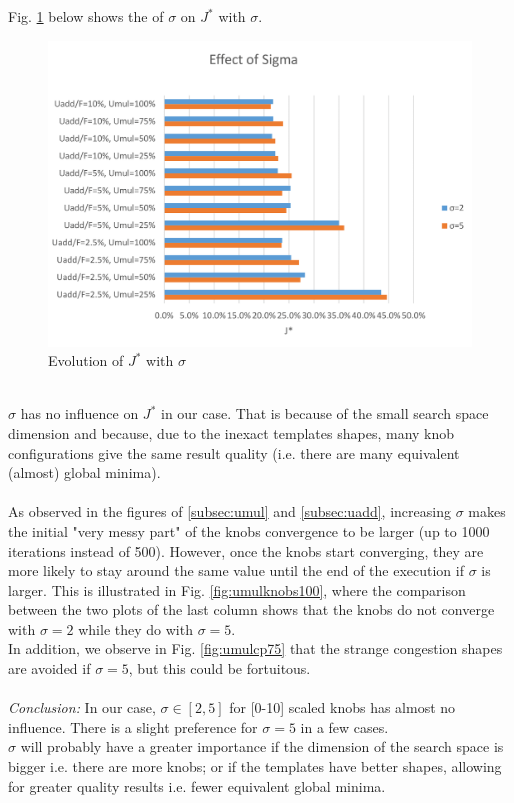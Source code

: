 Fig. \ref{fig:sigma} below shows the of $\sigma$ on $J^{*}$ with $\sigma$.\\
\begin{figure}[!h]
	\caption{Evolution of $J^{*}$ with $\sigma$}
	\label{fig:sigma}
	\includegraphics[width=7in]{figures/sigma.png}
\end{figure}\\
$\sigma$ has no influence on $J^{*}$ in our case. That is because of the small search space dimension and because, due to the inexact templates shapes, many knob configurations give the same result quality (i.e. there are many equivalent (almost) global minima).\\
\\
As observed in the figures of \ref{subsec:umul} and \ref{subsec:uadd}, increasing $\sigma$ makes the initial  "very messy part" of the knobs convergence to be larger (up to 1000 iterations instead of 500). However, once the knobs start converging, they are more likely to stay around the same value until the end of the execution if $\sigma$ is larger. This is illustrated in Fig. \ref{fig:umulknobs100}, where the comparison between the two plots of the last column shows that the knobs do not converge with $\sigma=2$ while they do with $\sigma=5$.\\
In addition, we observe in Fig. \ref{fig:umulcp75} that the strange congestion shapes are avoided if $\sigma=5$, but this could be fortuitous.\\
\\
\emph{Conclusion:} In our case, $\sigma \in [2,5]$ for [0-10] scaled knobs has almost no influence. There is a slight preference for $\sigma=5$ in a few cases. \\
$\sigma$ will probably have a greater importance if the dimension of the search space is bigger i.e. there are more knobs; or if the templates have better shapes, allowing for greater quality results i.e. fewer equivalent global minima.